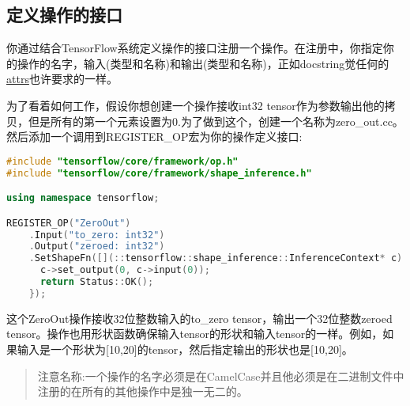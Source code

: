 \subsection{定义操作的接口}
你通过结合TensorFlow系统定义操作的接口注册一个操作。在注册中，你指定你的操作的名字，输入(类型和名称)和输出(类型和名称)，正如docstring觉任何的\href{https://www.tensorflow.org/extend/adding_an_op?hl=zh-cn#attrs}{attrs}也许要求的一样。

为了看着如何工作，假设你想创建一个操作接收int32 tensor作为参数输出他的拷贝，但是所有的第一个元素设置为0.为了做到这个，创建一个名称为zero\_out.cc。然后添加一个调用到REGISTER\_OP宏为你的操作定义接口:
\begin{lstlisting}[language=C++]
#include "tensorflow/core/framework/op.h"
#include "tensorflow/core/framework/shape_inference.h"

using namespace tensorflow;

REGISTER_OP("ZeroOut")
    .Input("to_zero: int32")
    .Output("zeroed: int32")
    .SetShapeFn([](::tensorflow::shape_inference::InferenceContext* c) {
      c->set_output(0, c->input(0));
      return Status::OK();
    });

\end{lstlisting}
这个ZeroOut操作接收32位整数输入的to\_zero tensor，输出一个32位整数zeroed tensor。操作也用形状函数确保输入tensor的形状和输入tensor的一样。例如，如果输入是一个形状为[10,20]的tensor，然后指定输出的形状也是[10,20]。
\begin{quote}
注意名称:一个操作的名字必须是在CamelCase并且他必须是在二进制文件中注册的在所有的其他操作中是独一无二的。
\end{quote}
